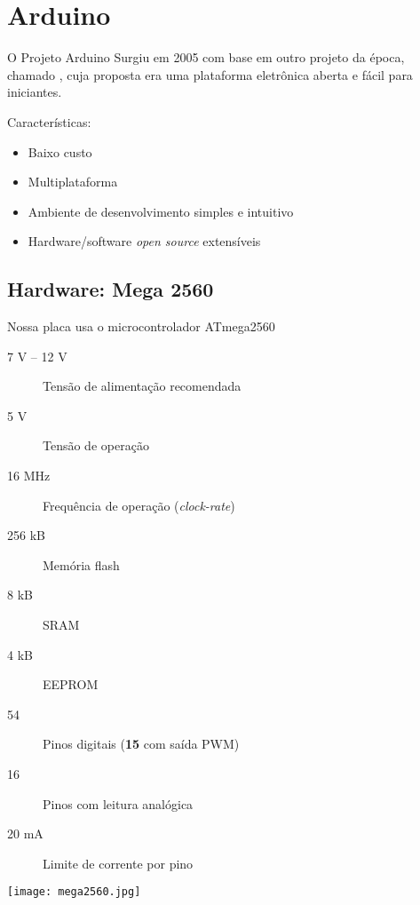 \section{Arduino}


\begin{frame}{O Projeto Arduino}
  Surgiu em 2005 com base em outro projeto da época, chamado , cuja proposta era uma plataforma eletrônica aberta e fácil para iniciantes.

  \medskip
  Características:
  \begin{itemize}
    \item Baixo custo
    \item Multiplataforma
    \item Ambiente de desenvolvimento simples e intuitivo
    \item Hardware/software \textit{open source} extensíveis
  \end{itemize}
\end{frame}


\subsection{Hardware: Mega 2560}


\begin{frame}{\insertsubsection}
  Nossa placa usa o microcontrolador \textcolor{CustomTeal}{ATmega2560}
  \begin{description}
    \item[7 V -- 12 V] Tensão de alimentação recomendada
    \item[5 V] Tensão de operação
    \item[16 MHz] Frequência de operação (\textit{clock-rate})
    \item[256 kB] Memória flash
    \item[8 kB] SRAM
    \item[4 kB] EEPROM
    \item[54] Pinos digitais (\textbf{\textcolor{CustomOrange}{15}} com saída PWM)
    \item[16] Pinos com leitura analógica
    \item[20 mA] Limite de corrente por pino
  \end{description}
\end{frame}


{ 
\begin{frame}{\insertsubsection}
  \texttt{[image: mega2560.jpg]}
\end{frame}
}


